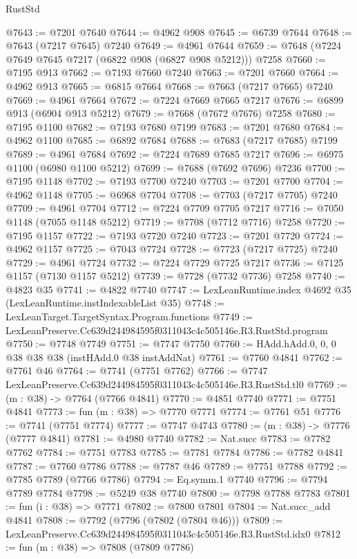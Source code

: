 \begin{lexlean}{RustStd}
\begin{coremodule}
@7643 := @7201 @7640
@7644 := @4962 @908
@7645 := @6739 @7644
@7648 := @7643 (@7217 @7645) @7240
@7649 := @4961 @7644
@7659 := @7648 (@7224 @7649 @7645 @7217 (@6822 @908 (@6827 @908 @5212))) @7258
@7660 := @7195 @913
@7662 := @7193 @7660 @7240
@7663 := @7201 @7660
@7664 := @4962 @913
@7665 := @6815 @7664
@7668 := @7663 (@7217 @7665) @7240
@7669 := @4961 @7664
@7672 := @7224 @7669 @7665 @7217
@7676 := @6899 @913 (@6904 @913 @5212)
@7679 := @7668 (@7672 @7676) @7258
@7680 := @7195 @1100
@7682 := @7193 @7680 @7199
@7683 := @7201 @7680
@7684 := @4962 @1100
@7685 := @6892 @7684
@7688 := @7683 (@7217 @7685) @7199
@7689 := @4961 @7684
@7692 := @7224 @7689 @7685 @7217
@7696 := @6975 @1100 (@6980 @1100 @5212)
@7699 := @7688 (@7692 @7696) @7236
@7700 := @7195 @1148
@7702 := @7193 @7700 @7240
@7703 := @7201 @7700
@7704 := @4962 @1148
@7705 := @6968 @7704
@7708 := @7703 (@7217 @7705) @7240
@7709 := @4961 @7704
@7712 := @7224 @7709 @7705 @7217
@7716 := @7050 @1148 (@7055 @1148 @5212)
@7719 := @7708 (@7712 @7716) @7258
@7720 := @7195 @1157
@7722 := @7193 @7720 @7240
@7723 := @7201 @7720
@7724 := @4962 @1157
@7725 := @7043 @7724
@7728 := @7723 (@7217 @7725) @7240
@7729 := @4961 @7724
@7732 := @7224 @7729 @7725 @7217
@7736 := @7125 @1157 (@7130 @1157 @5212)
@7739 := @7728 (@7732 @7736) @7258
@7740 := @4823 @35
@7741 := @4822 @7740
@7747 := LexLeanRuntime.index @4692 @35 (LexLeanRuntime.instIndexableList @35)
@7748 := LexLeanTarget.TargetSyntax.Program.functions
@7749 := LexLeanPreserve.Cc639d244984595f0311043c4c505146e.R3.RustStd.program
@7750 := @7748 @7749
@7751 := @7747 @7750
@7760 := HAdd.hAdd.{0, 0, 0} @38 @38 @38 (instHAdd.{0} @38 instAddNat)
@7761 := @7760 @4841
@7762 := @7761 @46
@7764 := @7741 (@7751 @7762)
@7766 := @7747 LexLeanPreserve.Cc639d244984595f0311043c4c505146e.R3.RustStd.tl0
@7769 := (m : @38) -> @7764 (@7766 @4841)
@7770 := @4851 @7740
@7771 := @7751 @4841
@7773 := fun (m : @38) => @7770 @7771
@7774 := @7761 @51
@7776 := @7741 (@7751 @7774)
@7777 := @7747 @4743
@7780 := (m : @38) -> @7776 (@7777 @4841)
@7781 := @4980 @7740
@7782 := Nat.succ
@7783 := @7782 @7762
@7784 := @7751 @7783
@7785 := @7781 @7784
@7786 := @7782 @4841
@7787 := @7760 @7786
@7788 := @7787 @46
@7789 := @7751 @7788
@7792 := @7785 @7789 (@7766 @7786)
@7794 := Eq.symm.{1} @7740
@7796 := @7794 @7789 @7784
@7798 := @5249 @38 @7740
@7800 := @7798 @7788 @7783
@7801 := fun (i : @38) => @7771
@7802 := @7800 @7801
@7804 := Nat.succ_add @4841
@7808 := @7792 (@7796 (@7802 (@7804 @46)))
@7809 := LexLeanPreserve.Cc639d244984595f0311043c4c505146e.R3.RustStd.idx0
@7812 := fun (m : @38) => @7808 (@7809 @7786)

\end{coremodule}
\end{lexlean}
